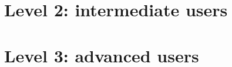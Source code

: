 \documentclass[a4paper,11pt]{book}
\begin{document}
\part{Level 2: intermediate users}




\part{Level 3: advanced users}




\end{document}
